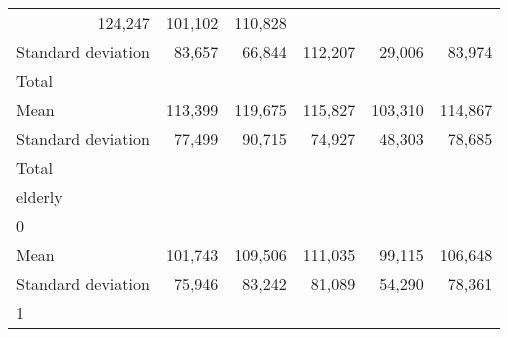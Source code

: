 \begin{tabular}{llllll}
  \multicolumn{1}{r}{124,247} &
  \multicolumn{1}{r}{101,102} &
  \multicolumn{1}{r}{110,828} \\
\multicolumn{1}{l}{\hspace{4em}Standard deviation} &
  \multicolumn{1}{|r}{83,657} &
  \multicolumn{1}{r}{66,844} &
  \multicolumn{1}{r}{112,207} &
  \multicolumn{1}{r}{29,006} &
  \multicolumn{1}{r}{83,974} \\
\multicolumn{1}{l}{\hspace{3em}Total} &
  \multicolumn{1}{|r}{} &
  \multicolumn{1}{r}{} &
  \multicolumn{1}{r}{} &
  \multicolumn{1}{r}{} &
  \multicolumn{1}{r}{} \\
\multicolumn{1}{l}{\hspace{4em}Mean} &
  \multicolumn{1}{|r}{113,399} &
  \multicolumn{1}{r}{119,675} &
  \multicolumn{1}{r}{115,827} &
  \multicolumn{1}{r}{103,310} &
  \multicolumn{1}{r}{114,867} \\
\multicolumn{1}{l}{\hspace{4em}Standard deviation} &
  \multicolumn{1}{|r}{77,499} &
  \multicolumn{1}{r}{90,715} &
  \multicolumn{1}{r}{74,927} &
  \multicolumn{1}{r}{48,303} &
  \multicolumn{1}{r}{78,685} \\
\multicolumn{1}{l}{\hspace{1em}Total} &
  \multicolumn{1}{|r}{} &
  \multicolumn{1}{r}{} &
  \multicolumn{1}{r}{} &
  \multicolumn{1}{r}{} &
  \multicolumn{1}{r}{} \\
\multicolumn{1}{l}{\hspace{2em}elderly} &
  \multicolumn{1}{|r}{} &
  \multicolumn{1}{r}{} &
  \multicolumn{1}{r}{} &
  \multicolumn{1}{r}{} &
  \multicolumn{1}{r}{} \\
\multicolumn{1}{l}{\hspace{3em}0} &
  \multicolumn{1}{|r}{} &
  \multicolumn{1}{r}{} &
  \multicolumn{1}{r}{} &
  \multicolumn{1}{r}{} &
  \multicolumn{1}{r}{} \\
\multicolumn{1}{l}{\hspace{4em}Mean} &
  \multicolumn{1}{|r}{101,743} &
  \multicolumn{1}{r}{109,506} &
  \multicolumn{1}{r}{111,035} &
  \multicolumn{1}{r}{99,115} &
  \multicolumn{1}{r}{106,648} \\
\multicolumn{1}{l}{\hspace{4em}Standard deviation} &
  \multicolumn{1}{|r}{75,946} &
  \multicolumn{1}{r}{83,242} &
  \multicolumn{1}{r}{81,089} &
  \multicolumn{1}{r}{54,290} &
  \multicolumn{1}{r}{78,361} \\
\multicolumn{1}{l}{\hspace{3em}1} &

\end{tabular}
